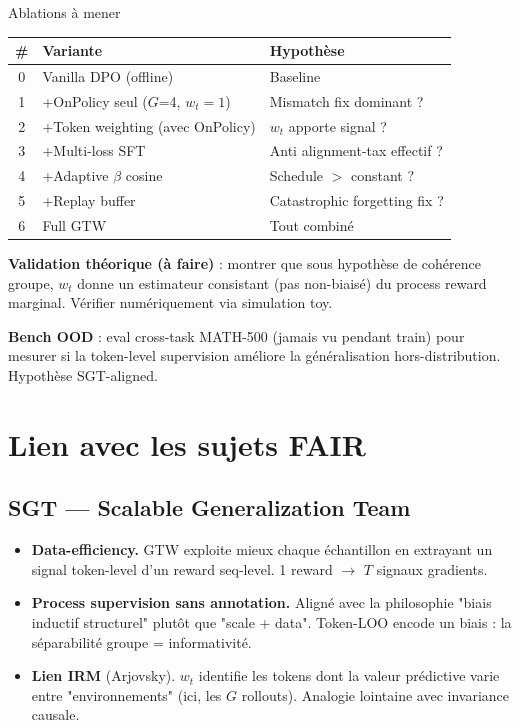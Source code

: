 \documentclass[10pt,a4paper]{article}
\begin{document}
\begin{idea}{Ablations à mener}
\begin{center}
\begin{tabular}{|c|l|l|}
\hline
\# & \textbf{Variante} & \textbf{Hypothèse} \\
\hline
0 & Vanilla DPO (offline) & Baseline \\
1 & +OnPolicy seul ($G$=4, $w_t = 1$) & Mismatch fix dominant ? \\
2 & +Token weighting (avec OnPolicy) & $w_t$ apporte signal ? \\
3 & +Multi-loss SFT & Anti alignment-tax effectif ? \\
4 & +Adaptive $\beta$ cosine & Schedule $>$ constant ? \\
5 & +Replay buffer & Catastrophic forgetting fix ? \\
6 & Full GTW & Tout combiné \\
\hline
\end{tabular}
\end{center}
\end{idea}

\textbf{Validation théorique (à faire)} : montrer que sous hypothèse de cohérence groupe, $w_t$ donne un estimateur consistant (pas non-biaisé) du process reward marginal. Vérifier numériquement via simulation toy.

\textbf{Bench OOD} : eval cross-task MATH-500 (jamais vu pendant train) pour mesurer si la token-level supervision améliore la généralisation hors-distribution. Hypothèse SGT-aligned.

\section{Lien avec les sujets FAIR}

\subsection{SGT --- Scalable Generalization Team}

\begin{itemize}[leftmargin=*]
  \item \textbf{Data-efficiency.} GTW exploite mieux chaque échantillon en extrayant un signal token-level d'un reward seq-level. 1 reward $\to$ $T$ signaux gradients.
  \item \textbf{Process supervision sans annotation.} Aligné avec la philosophie "biais inductif structurel" plutôt que "scale + data". Token-LOO encode un biais : la séparabilité groupe = informativité.
  \item \textbf{Lien IRM} (Arjovsky). $w_t$ identifie les tokens dont la valeur prédictive varie entre "environnements" (ici, les $G$ rollouts). Analogie lointaine avec invariance causale.
\end{itemize}
\end{document}
